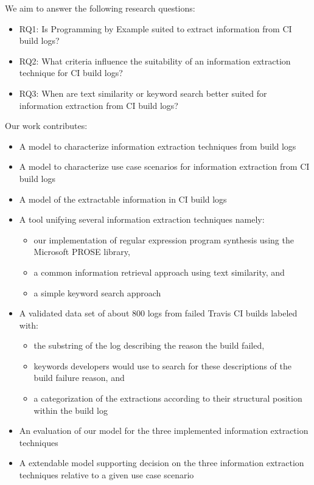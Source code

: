 \documentclass[\myrootdir/main.tex]{subfiles}
\begin{document}

We aim to answer the following research questions:

\begin{itemize}
  \item{RQ1:} Is Programming by Example suited to extract information from CI build logs?
  \item{RQ2:} What criteria influence the suitability of an information extraction technique for CI build logs?
  \item{RQ3:} When are text similarity or keyword search better suited for information extraction from CI build logs?
\end{itemize}


Our work contributes:

\begin{itemize}
  \item A model to characterize information extraction techniques from  build logs
  \item A model to characterize use case scenarios for information extraction from CI build logs
  \item A model of the extractable information in CI build logs
  \item A tool unifying several information extraction techniques namely:
        \begin{itemize}
          \item our implementation of regular expression program synthesis using the Microsoft PROSE library,
          \item a common information retrieval approach using text similarity, and
          \item a simple keyword search approach
        \end{itemize}
  \item A validated data set of about 800 logs from failed Travis CI builds labeled with:
        \begin{itemize}
          \item the substring of the log describing the reason the build failed,
          \item keywords developers would use to search for these descriptions of the build failure reason, and
          \item a categorization of the extractions according to their structural position within the build log
        \end{itemize}
  \item An evaluation of our model for the three implemented information extraction techniques 
  \item A extendable model  supporting decision on the three information extraction techniques relative to a given use case scenario
\end{itemize}
\end{document}
